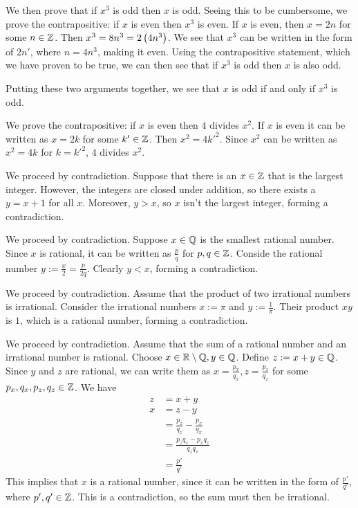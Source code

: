 \documentclass{article}
\begin{document}
We then prove that if $x^3$ is odd then $x$ is odd.
Seeing this to be cumbersome, we prove the contrapositive: if $x$ is even then $x^3$ is even.
If $x$ is even, then $x = 2n$ for some $n \in \mathbb Z$.
Then $x^3 = 8n^3 = 2 \left (4n^3 \right)$.
We see that $x^3$ can be written in the form of $2 n'$, where $n = 4n^3$, making it even.
Using the contrapositive statement, which we have proven to be true, we can then see that if $x^3$ is odd then $x$ is also odd.

Putting these two arguments together, we see that $x$ is odd if and only if $x^3$ is odd. 



We prove the contrapositive: if $x$ is even then $4$ divides $x^2$.
If $x$ is even it can be written as $x = 2k$ for some $k' \in \mathbb Z$.
Then $x^2 = 4k'^2$.
Since $x^2$ can be written as $x^2 = 4k$ for $k = k'^2$, $4$ divides $x^2$.

\problem{}

We proceed by contradiction.
Suppose that there is an $x \in \mathbb Z$ that is the largest integer.
However, the integers are closed under addition, so there exists a $y = x+1$ for all $x$.
Moreover, $y > x$, so $x$ isn't the largest integer, forming a contradiction.

We proceed by contradiction.
Suppose $x \in \mathbb Q$ is the smallest rational number.
Since $x$ is rational, it can be written as $\frac{p}{q}$ for $p, q \in \mathbb Z$.
Conside the rational number $y := \frac{x}{2} = \frac{p}{2q}$. Clearly $y < x$, forming a contradiction.

We proceed by contradiction.
Assume that the product of two irrational numbers is irrational.
Consider the irrational numbers $x := \pi$ and $y := \frac{1}{\pi}$.
Their product $xy$ is $1$, which is a rational number, forming a contradiction.

We proceed by contradiction.
Assume that the sum of a rational number and an irrational number is rational.
Choose $x \in \mathbb R\setminus\mathbb Q, y \in \mathbb Q$.
Define $z := x + y \in \mathbb Q$.
Since $y$ and $z$ are rational, we can write them as $x = \frac{p_x}{q_x}, z = \frac{p_z}{q_z}$ for some $p_x, q_x, p_z, q_z \in \mathbb Z$.
We have
\begin{align*}
  z &= x + y \\
  x &= z - y \\
    &= \frac{p_z}{q_z} - \frac{p_x}{q_x} \\
    &= \frac{p_z q_x - p_x q_z}{q_z q_x} \\
    &= \frac{p'}{q'}
\end{align*}
This implies that $x$ is a rational number, since it can be written in the form of $\frac{p'}{q'}$, where $p', q' \in \mathbb Z$.
This is a contradiction, so the sum must then be irrational.
\end{document}
